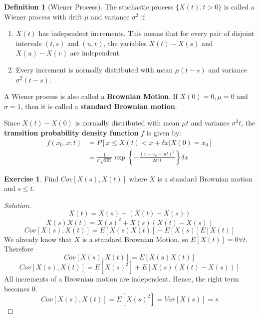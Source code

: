 \documentclass[12pt,letterpaper]{book}
\theoremstyle{definition}
\newtheorem{definition}{Definition}%
\newtheorem*{exercise}{Exercise}
\newenvironment{solution}
  {\renewcommand\qedsymbol{$\blacksquare$}\begin{proof}[Solution]}
  {\end{proof}}
\begin{document}
\begin{definition}[Wiener Process]
  The stochastic process $\{X(t), t > 0\}$ is called a Wiener process with drift $\mu$ and variance $\sigma^2$ if
  \begin{enumerate}
    \item $X(t)$ has independent increments. This means that for every pair of disjoint intervals $(t,s)$ and $(u,v)$, the variables $X(t) - X(s)$ and $X(u) - X(v)$ are independent.
    \item Every increment is normally distributed with mean $\mu(t-s)$ and variance $\sigma^2(t-s)$.
  \end{enumerate}
\end{definition}

A Wiener process is also called a \textbf{Brownian Motion}. If $X(0) = 0,\mu = 0$ and $\sigma = 1$, then it is called a \textbf{standard Brownian motion}.

Since $X(t) - X(0)$ is normally distributed with mean $\mu t$ and variance $\sigma^2 t$, the \textbf{transition probability density function} $f$ is given by:
\begin{align*}
  f(x_0,x;t) &= P[x \leq X(t) < x+\delta x | X(0) = x_0] \\
             &= \frac{1}{\sigma \sqrt{2 \pi t}} \exp \left\{- \frac{(x-x_0-\mu t)^2}{2 \sigma^2 t} \right\} \delta x
\end{align*}

\begin{exercise}
  Find $Cov[X(s), X(t)]$ where $X$ is a standard Brownian motion and $s \leq t$.
\end{exercise}
\begin{solution}
  \[X(t) = X(s) + (X(t) - X(s))\]
  \[X(s)X(t) = X(s)^2 + X(s)(X(t) - X(s))\]
  \[Cov[X(s), X(t)] = E[X(s) X(t)] - E[X(s)] E[X(t)]\]
  We already know that $X$ is a standard Brownian Motion, so $E[X(t)] = 0 \forall t$. Therefore
  \[Cov[X(s), X(t)] = E[X(s)X(t)]\]
  \[Cov[X(s), X(t)] = E[X(s)^2] + E[X(s)(X(t) - X(s))]\]
  All increments of a Brownian motion are independent. Hence, the right term becomes 0.
  \[Cov[X(s), X(t)] = E[X(s)^2] = Var[X(s)] = s\]
\end{solution}
\end{document}
